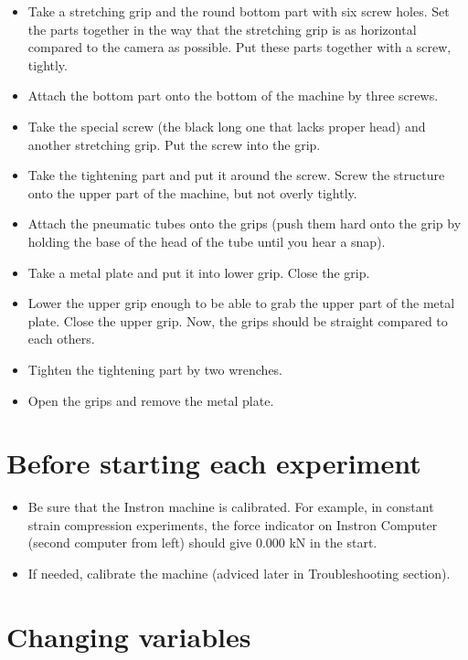 \documentclass[a4paper]{article}
\begin{document}
\begin{itemize}
  \item Take a stretching grip and the round bottom part with six screw holes. Set the parts together in the way that the stretching grip is as horizontal compared to the camera as possible. Put these parts together with a screw, tightly.
  \item Attach the bottom part onto the bottom of the machine by three screws.
  \item Take the special screw (the black long one that lacks proper head) and another stretching grip. Put the screw into the grip.
  \item Take the tightening part and put it around the screw. Screw the structure onto the upper part of the machine, but not overly tightly.
  \item Attach the pneumatic tubes onto the grips (push them hard onto the grip by holding the base of the head of the tube until you hear a snap).
  \item Take a metal plate and put it into lower grip. Close the grip.
  \item Lower the upper grip enough to be able to grab the upper part of the metal plate. Close the upper grip. Now, the grips should be straight compared to each others.
  \item Tighten the tightening part by two wrenches.
  \item Open the grips and remove the metal plate.
\end{itemize}

\section{Before starting each experiment}

\begin{itemize}
  \item Be sure that the Instron machine is calibrated. For example, in constant strain compression experiments, the force indicator on Instron Computer (second computer from left) should give 0.000 kN in the start.
  \item If needed, calibrate the machine (adviced later in Troubleshooting section).
\end{itemize}

\section{Changing variables}
\end{document}
